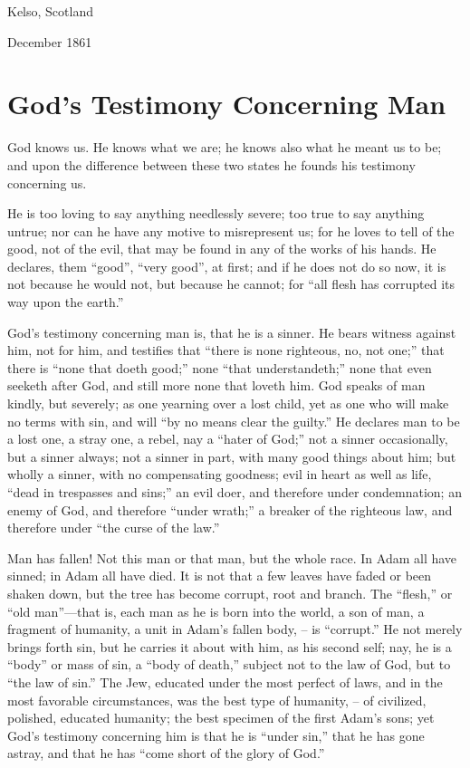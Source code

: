 \documentclass[
]{book}
\begin{document}
Kelso, Scotland

December 1861

\hypertarget{gods-testimony-concerning-man}{%
\chapter{God's Testimony Concerning Man}\label{gods-testimony-concerning-man}}

God knows us. He knows what we are; he knows also what he meant us to be; and upon the difference between these two states he founds his testimony concerning us.

He is too loving to say anything needlessly severe; too true to say anything untrue; nor can he have any motive to misrepresent us; for he loves to tell of the good, not of the evil, that may be found in any of the works of his hands. He declares, them ``good'', ``very good'', at first; and if he does not do so now, it is not because he would not, but because he cannot; for ``all flesh has corrupted its way upon the earth.''

God's testimony concerning man is, that he is a sinner. He bears witness against him, not for him, and testifies that ``there is none righteous, no, not one;'' that there is ``none that doeth good;'' none ``that understandeth;'' none that even seeketh after God, and still more none that loveth him. God speaks of man kindly, but severely; as one yearning over a lost child, yet as one who will make no terms with sin, and will ``by no means clear the guilty.'' He declares man to be a lost one, a stray one, a rebel, nay a ``hater of God;'' not a sinner occasionally, but a sinner always; not a sinner in part, with many good things about him; but wholly a sinner, with no compensating goodness; evil in heart as well as life, ``dead in trespasses and sins;'' an evil doer, and therefore under condemnation; an enemy of God, and therefore ``under wrath;'' a breaker of the righteous law, and therefore under ``the curse of the law.''

Man has fallen! Not this man or that man, but the whole race. In Adam all have sinned; in Adam all have died. It is not that a few leaves have faded or been shaken down, but the tree has become corrupt, root and branch. The ``flesh,'' or ``old man''---that is, each man as he is born into the world, a son of man, a fragment of humanity, a unit in Adam's fallen body, -- is ``corrupt.'' He not merely brings forth sin, but he carries it about with him, as his second self; nay, he is a ``body'' or mass of sin, a ``body of death,'' subject not to the law of God, but to ``the law of sin.'' The Jew, educated under the most perfect of laws, and in the most favorable circumstances, was the best type of humanity, -- of civilized, polished, educated humanity; the best specimen of the first Adam's sons; yet God's testimony concerning him is that he is ``under sin,'' that he has gone astray, and that he has ``come short of the glory of God.''
\end{document}
